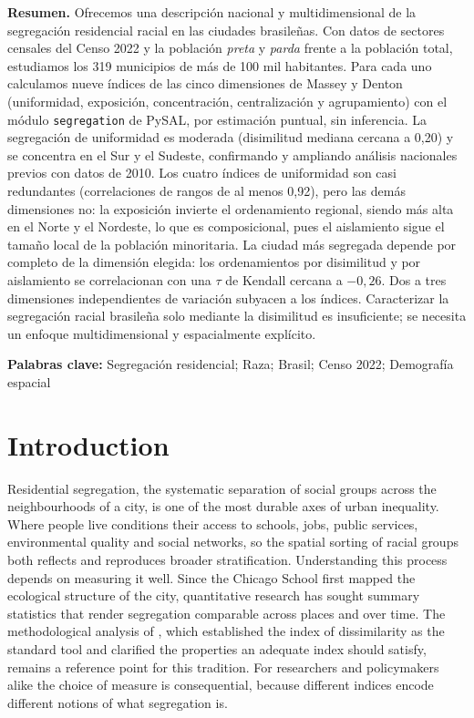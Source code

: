 \documentclass[12pt,a4paper]{article}
\begin{document}
\medskip
\noindent\textbf{Resumen.} Ofrecemos una descripci\'on nacional y multidimensional
de la segregaci\'on residencial racial en las ciudades brasile\~nas. Con datos de
sectores censales del Censo 2022 y la poblaci\'on \emph{preta} y \emph{parda}
frente a la poblaci\'on total, estudiamos los 319 municipios de m\'as de 100 mil
habitantes. Para cada uno calculamos nueve \'indices de las cinco dimensiones de
Massey y Denton (uniformidad, exposici\'on, concentraci\'on, centralizaci\'on y
agrupamiento) con el m\'odulo \texttt{segregation} de PySAL, por estimaci\'on
puntual, sin inferencia. La segregaci\'on de uniformidad es moderada (disimilitud
mediana cercana a 0,20) y se concentra en el Sur y el Sudeste, confirmando y
ampliando an\'alisis nacionales previos con datos de 2010. Los cuatro \'indices de
uniformidad son casi redundantes (correlaciones de rangos de al menos 0,92),
pero las dem\'as dimensiones no: la exposici\'on invierte el ordenamiento
regional, siendo m\'as alta en el Norte y el Nordeste, lo que es composicional,
pues el aislamiento sigue el tama\~no local de la poblaci\'on minoritaria. La
ciudad m\'as segregada depende por completo de la dimensi\'on elegida: los
ordenamientos por disimilitud y por aislamiento se correlacionan con una $\tau$
de Kendall cercana a $-0{,}26$. Dos a tres dimensiones independientes de
variaci\'on subyacen a los \'indices. Caracterizar la segregaci\'on racial
brasile\~na solo mediante la disimilitud es insuficiente; se necesita un enfoque
multidimensional y espacialmente expl\'icito.

\medskip
\noindent\textbf{Palabras clave:} Segregaci\'on residencial; Raza; Brasil; Censo
2022; Demograf\'ia espacial

\section{Introduction}\label{sec:intro}

Residential segregation, the systematic separation of social groups across the neighbourhoods of a city, is one of the most durable axes of urban inequality. Where people live conditions their access to schools, jobs, public services, environmental quality and social networks, so the spatial sorting of racial groups both reflects and reproduces broader stratification. Understanding this process depends on measuring it well. Since the Chicago School first mapped the ecological structure of the city, quantitative research has sought summary statistics that render segregation comparable across places and over time. The methodological analysis of \citet{duncan1955methodological}, which established the index of dissimilarity as the standard tool and clarified the properties an adequate index should satisfy, remains a reference point for this tradition. For researchers and policymakers alike the choice of measure is consequential, because different indices encode different notions of what segregation is.
\end{document}
